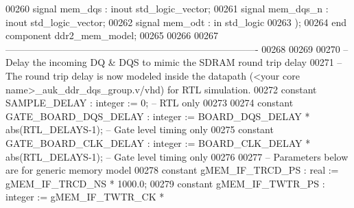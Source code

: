\begin{DoxyCode}
00260         \textcolor{keywordflow}{signal} mem_dqs             : \textcolor{keywordflow}{inout}  \textcolor{comment}{std\_logic\_vector};
00261         \textcolor{keywordflow}{signal} mem_dqs_n           : \textcolor{keywordflow}{inout}  \textcolor{comment}{std\_logic\_vector};
00262         \textcolor{keywordflow}{signal} mem_odt             : \textcolor{keywordflow}{in}     \textcolor{comment}{std\_logic}
00263     );
00264     \textcolor{keywordflow}{end} \textcolor{keywordflow}{component} \textcolor{vhdlchar}{ddr2_mem_model};
00265 
00266     
00267 \textcolor{keyword}{    -------------------------------------------------------------------------------}
00268 
00269 
00270 \textcolor{keyword}{    -- Delay the incoming DQ & DQS to mimic the SDRAM round trip delay}
00271 \textcolor{keyword}{    -- The round trip delay is now modeled inside the datapath (<your core name>\_auk\_ddr\_dqs\_group.v/vhd)
       for RTL simulation.}
00272     \textcolor{keywordflow}{constant} \textcolor{vhdlchar}{SAMPLE_DELAY} \textcolor{vhdlchar}{:} \textcolor{comment}{integer} \textcolor{vhdlchar}{:=} \textcolor{vhdllogic}{}\textcolor{vhdllogic}{0};\textcolor{keyword}{ -- RTL only}
00273 
00274     \textcolor{keywordflow}{constant} \textcolor{vhdlchar}{GATE_BOARD_DQS_DELAY}  \textcolor{vhdlchar}{:} \textcolor{comment}{integer} \textcolor{vhdlchar}{:=} \textcolor{vhdlchar}{BOARD_DQS_DELAY} \textcolor{vhdlchar}{*} \textcolor{keywordflow}{abs}\textcolor{vhdlchar}{(}\textcolor{vhdlchar}{RTL_DELAYS}\textcolor{vhdlchar}{-}\textcolor{vhdllogic}{}\textcolor{vhdllogic}{1}\textcolor{vhdlchar}{)};\textcolor{keyword}{            -- Gate
       level timing only}
00275     \textcolor{keywordflow}{constant} \textcolor{vhdlchar}{GATE_BOARD_CLK_DELAY}  \textcolor{vhdlchar}{:} \textcolor{comment}{integer} \textcolor{vhdlchar}{:=} \textcolor{vhdlchar}{BOARD_CLK_DELAY} \textcolor{vhdlchar}{*} \textcolor{keywordflow}{abs}\textcolor{vhdlchar}{(}\textcolor{vhdlchar}{RTL_DELAYS}\textcolor{vhdlchar}{-}\textcolor{vhdllogic}{}\textcolor{vhdllogic}{1}\textcolor{vhdlchar}{)};\textcolor{keyword}{            -- Gate
       level timing only}
00276     
00277 \textcolor{keyword}{    -- Parameters below are for generic memory model}
00278     \textcolor{keywordflow}{constant} \textcolor{vhdlchar}{gMEM_IF_TRCD_PS}       \textcolor{vhdlchar}{:} \textcolor{comment}{real} \textcolor{vhdlchar}{:=} \textcolor{vhdlchar}{gMEM_IF_TRCD_NS} \textcolor{vhdlchar}{*} \textcolor{vhdllogic}{}\textcolor{vhdllogic}{1000}.\textcolor{vhdllogic}{0};
00279     \textcolor{keywordflow}{constant} \textcolor{vhdlchar}{gMEM_IF_TWTR_PS}       \textcolor{vhdlchar}{:} \textcolor{comment}{integer} \textcolor{vhdlchar}{:=} \textcolor{vhdlchar}{gMEM_IF_TWTR_CK} \textcolor{vhdlchar}{*} \textcolor{vhdlchar}{
}
\end{DoxyCode}
